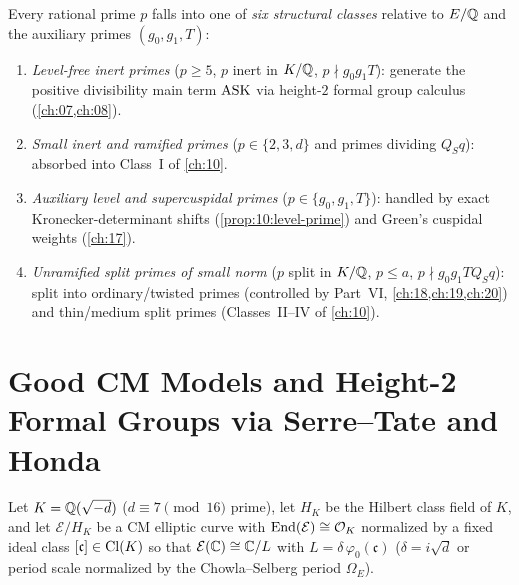 Every rational prime $p$ falls into one of \emph{six structural classes} relative to $E/\mathbb{Q}$ and the auxiliary primes $(g_0, g_1, T)$:
\begin{enumerate}[label=\textup{(\arabic*)}]
\item \emph{Level-free inert primes} ($p \ge 5$, $p$ inert in $K/\mathbb{Q}$, $p \nmid g_0 g_1 T$): generate the positive divisibility main term $\mathrm{ASK}$ via height-$2$ formal group calculus (\cref{ch:07,ch:08}).
\item \emph{Small inert and ramified primes} ($p \in \{2, 3, d\}$ and primes dividing $Q_S q$): absorbed into Class~I of \cref{ch:10}.
\item \emph{Auxiliary level and supercuspidal primes} ($p \in \{g_0, g_1, T\}$): handled by exact Kronecker-determinant shifts (\cref{prop:10:level-prime}) and Green's cuspidal weights (\cref{ch:17}).
\item \emph{Unramified split primes of small norm} ($p$ split in $K/\mathbb{Q}$, $p \le a$, $p \nmid g_0 g_1 T Q_S q$): split into ordinary/twisted primes (controlled by Part~VI, \cref{ch:18,ch:19,ch:20}) and thin/medium split primes (Classes~II--IV of \cref{ch:10}).
\end{enumerate}

\section{Good CM Models and Height-2 Formal Groups via Serre--Tate and Honda}
\label{sec:07:cm-good-models}

Let $K = \mathbb{Q}(\sqrt{-d})$ ($d \equiv 7 \pmod{16}$ prime), let $H_K$ be the Hilbert class field of $K$, and let $\mathcal{E}/H_K$ be a CM elliptic curve with $\mathrm{End}(\mathcal{E}) \cong \mathcal{O}_K$ normalized by a fixed ideal class $[\mathfrak{c}] \in \mathrm{Cl}(K)$ so that $\mathcal{E}(\mathbb{C}) \cong \mathbb{C} / L$ with $L = \delta\,\varphi_0(\mathfrak{c})$ ($\delta = i\sqrt{d}$ or period scale normalized by the Chowla--Selberg period $\Omega_E$).


